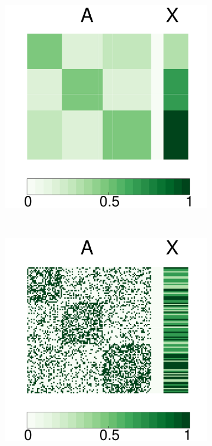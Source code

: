 \documentclass[12pt]{article}
\begin{document}
\begin{figure}[H]
	\centering
	\begin{subfigure}[b]{0.23\textwidth}
		\includegraphics[width=\textwidth]{../../Figure/Pmat.pdf}
		\caption{}
		\label{fig:a}
	\end{subfigure}
	~ %
	\begin{subfigure}[b]{0.23\textwidth}
		\includegraphics[width=\textwidth]{../../Figure/Amat.pdf}

\end{subfigure}
\end{figure}
\end{document}
